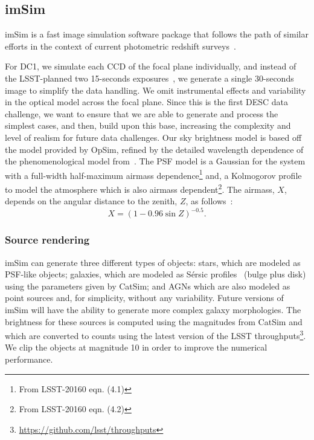 \documentclass[twocolumn]{aastex62}
\begin{document}
\subsection{imSim}
\label{sec:imsim_pipeline}

imSim is a fast image simulation software package that follows the path of similar efforts in the context of current photometric redshift surveys~\citet{2016MNRAS.457..786S,2016ApJ...817...25B}. 

For DC1, we simulate each CCD of the focal plane individually, and instead of the LSST-planned two 15-seconds exposures~\citep{Overview}, we generate a single 30-seconds image to simplify the data handling. We omit instrumental effects and variability in the optical model across the focal plane. Since this is the first DESC data challenge, we want to ensure that we are able to generate and process the simplest cases, and then, build upon this base, increasing the complexity and level of realism for future data challenges. Our sky brightness model is based off the \citet{1991PASP..103.1033K} model provided by OpSim, refined by the detailed wavelength dependence of the phenomenological model from~\citet{2016SPIE.9910E..1AY}. The PSF model is a Gaussian for the system with a full-width half-maximum airmass dependence\footnote{From LSST-20160 eqn. (4.1)} and, a Kolmogorov profile to model the atmosphere which is also airmass dependent\footnote{From LSST-20160 eqn. (4.2)}. The airmass, $X$, depends on the angular distance to the zenith, $Z$, as follows~\citep{1991PASP..103.1033K}:
\begin{equation}
X = (1 - 0.96\sin{Z})^{-0.5}.
\end{equation}

\subsubsection{Source rendering}
imSim can generate three different types of objects: stars, which are modeled as PSF-like objects; galaxies, which are modeled as S\'{e}rsic profiles~\citep{1963BAAA....6...41S} (bulge plus disk) using
the parameters given by CatSim; and AGNs which are also modeled as point sources and, for simplicity, without any variability. Future versions of imSim will have the ability to generate more complex galaxy morphologies. The brightness for these sources is computed using the magnitudes from CatSim and which are converted to counts using the latest version of the LSST throughputs\footnote{\url{https://github.com/lsst/throughputs}}. We clip the objects at magnitude 10 in order to improve the numerical performance.
\end{document}
